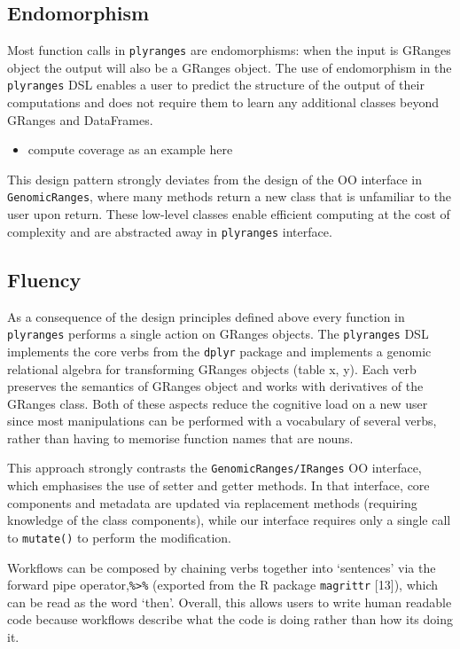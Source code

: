 \documentclass[10pt,letterpaper]{article}
\providecommand{\tightlist}{%
  \setlength{\itemsep}{0pt}\setlength{\parskip}{0pt}}
\begin{document}
\subsection{Endomorphism}\label{endomorphism}

Most function calls in \texttt{plyranges} are endomorphisms: when the
input is GRanges object the output will also be a GRanges object. The
use of endomorphism in the \texttt{plyranges} DSL enables a user to
predict the structure of the output of their computations and does not
require them to learn any additional classes beyond GRanges and
DataFrames.

\begin{itemize}
\tightlist
\item
  compute coverage as an example here
\end{itemize}

This design pattern strongly deviates from the design of the OO
interface in \texttt{GenomicRanges}, where many methods return a new
class that is unfamiliar to the user upon return. These low-level
classes enable efficient computing at the cost of complexity and are
abstracted away in \texttt{plyranges} interface.

\subsection{Fluency}\label{fluency}

As a consequence of the design principles defined above every function
in \texttt{plyranges} performs a single action on GRanges objects. The
\texttt{plyranges} DSL implements the core verbs from the \texttt{dplyr}
package and implements a genomic relational algebra for transforming
GRanges objects (table x, y). Each verb preserves the semantics of
GRanges object and works with derivatives of the GRanges class. Both of
these aspects reduce the cognitive load on a new user since most
manipulations can be performed with a vocabulary of several verbs,
rather than having to memorise function names that are nouns.

This approach strongly contrasts the \texttt{GenomicRanges/IRanges} OO
interface, which emphasises the use of setter and getter methods. In
that interface, core components and metadata are updated via replacement
methods (requiring knowledge of the class components), while our
interface requires only a single call to \texttt{mutate()} to perform
the modification.

Workflows can be composed by chaining verbs together into `sentences'
via the forward pipe operator,\texttt{\%\textgreater{}\%} (exported from
the R package \texttt{magrittr} {[}13{]}), which can be read as the word
`then'. Overall, this allows users to write human readable code because
workflows describe what the code is doing rather than how its doing it.
\end{document}

